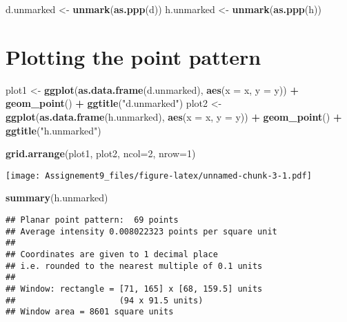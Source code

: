 \documentclass[]{article}
\newenvironment{Shaded}{\begin{snugshade}}{\end{snugshade}}
\newcommand{\DataTypeTok}[1]{\textcolor[rgb]{0.13,0.29,0.53}{#1}}
\newcommand{\DecValTok}[1]{\textcolor[rgb]{0.00,0.00,0.81}{#1}}
\newcommand{\KeywordTok}[1]{\textcolor[rgb]{0.13,0.29,0.53}{\textbf{#1}}}
\newcommand{\NormalTok}[1]{#1}
\newcommand{\OperatorTok}[1]{\textcolor[rgb]{0.81,0.36,0.00}{\textbf{#1}}}
\newcommand{\StringTok}[1]{\textcolor[rgb]{0.31,0.60,0.02}{#1}}
\begin{document}
\begin{Shaded}
\begin{Highlighting}[]
\NormalTok{d.unmarked <-}\StringTok{ }\KeywordTok{unmark}\NormalTok{(}\KeywordTok{as.ppp}\NormalTok{(d))}
\NormalTok{h.unmarked <-}\StringTok{ }\KeywordTok{unmark}\NormalTok{(}\KeywordTok{as.ppp}\NormalTok{(h))}
\end{Highlighting}
\end{Shaded}

\hypertarget{plotting-the-point-pattern}{%
\section{Plotting the point pattern}\label{plotting-the-point-pattern}}

\begin{Shaded}
\begin{Highlighting}[]
\NormalTok{plot1 <-}\StringTok{ }\KeywordTok{ggplot}\NormalTok{(}\KeywordTok{as.data.frame}\NormalTok{(d.unmarked), }\KeywordTok{aes}\NormalTok{(}\DataTypeTok{x =}\NormalTok{ x, }\DataTypeTok{y =}\NormalTok{ y)) }\OperatorTok{+}\StringTok{ }\KeywordTok{geom_point}\NormalTok{() }\OperatorTok{+}\StringTok{ }\KeywordTok{ggtitle}\NormalTok{(}\StringTok{"d.unmarked"}\NormalTok{)}
\NormalTok{plot2 <-}\StringTok{ }\KeywordTok{ggplot}\NormalTok{(}\KeywordTok{as.data.frame}\NormalTok{(h.unmarked), }\KeywordTok{aes}\NormalTok{(}\DataTypeTok{x =}\NormalTok{ x, }\DataTypeTok{y =}\NormalTok{ y)) }\OperatorTok{+}\StringTok{ }\KeywordTok{geom_point}\NormalTok{() }\OperatorTok{+}\StringTok{ }\KeywordTok{ggtitle}\NormalTok{(}\StringTok{"h.unmarked"}\NormalTok{)}


\KeywordTok{grid.arrange}\NormalTok{(plot1, plot2, }\DataTypeTok{ncol=}\DecValTok{2}\NormalTok{, }\DataTypeTok{nrow=}\DecValTok{1}\NormalTok{)}
\end{Highlighting}
\end{Shaded}

\texttt{[image: Assignement9\_files/figure-latex/unnamed-chunk-3-1.pdf]}

\begin{Shaded}
\begin{Highlighting}[]
\KeywordTok{summary}\NormalTok{(h.unmarked)}
\end{Highlighting}
\end{Shaded}

\begin{verbatim}
## Planar point pattern:  69 points
## Average intensity 0.008022323 points per square unit
## 
## Coordinates are given to 1 decimal place
## i.e. rounded to the nearest multiple of 0.1 units
## 
## Window: rectangle = [71, 165] x [68, 159.5] units
##                     (94 x 91.5 units)
## Window area = 8601 square units
\end{verbatim}
\end{document}
